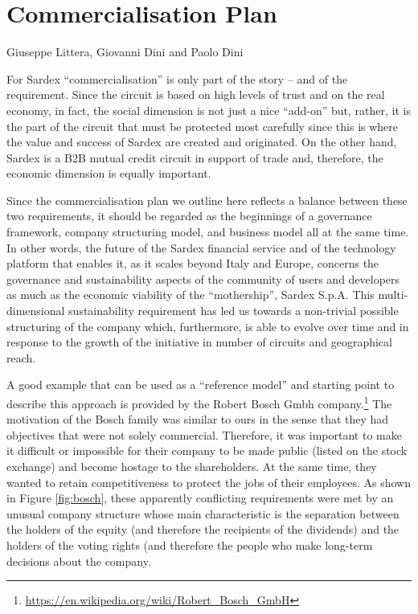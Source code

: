 \chapter{Commercialisation Plan}
\label{ch:commercialisation}

\vspace{-1cm}
\begin{center}
Giuseppe Littera, Giovanni Dini and Paolo Dini
\end{center}

For Sardex ``commercialisation'' is only part of the story -- and of the requirement. Since the circuit is based on high levels of trust and on the real economy, in fact, the social dimension is not just a nice ``add-on'' but, rather, it is the part of the circuit that must be protected most carefully since this is where the value and success of Sardex are created and originated. On the other hand, Sardex is a B2B mutual credit circuit in support of trade and, therefore, the economic dimension is equally important.

Since the commercialisation plan we outline here reflects a balance between these two requirements, it should be regarded as the beginnings of a governance framework, company structuring model, and business model all at the same time. In other words, the future of the Sardex financial service and of the technology platform that enables it, as it scales beyond Italy and Europe, concerns the governance and sustainability aspects of the community of users and developers as much as the economic viability of the ``mothership'', Sardex S.p.A. This multi-dimensional sustainability requirement has led us towards a non-trivial possible structuring of the company which, furthermore, is able to evolve over time and in response to the growth of the initiative in number of circuits and geographical reach.

A good example that can be used as a ``reference model'' and starting point to describe this approach is provided by the Robert Bosch Gmbh company.\footnote{\url{https://en.wikipedia.org/wiki/Robert_Bosch_GmbH}} The motivation of the Bosch family was similar to ours in the sense that they had objectives that were not solely commercial. Therefore, it was important to make it difficult or impossible for their company to be made public (listed on the stock exchange) and become hostage to the shareholders. At the same time, they wanted to retain competitiveness to protect the jobs of their employees. As shown in Figure \ref{fig:bosch}, these apparently conflicting requirements were met by an unusual company structure whose main characteristic is the separation between the holders of the equity (and therefore the recipients of the dividends) and the holders of the voting rights (and therefore the people who make long-term decisions about the company.

